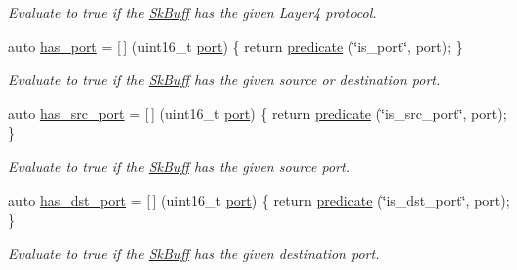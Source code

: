 \begin{DoxyCompactItemize}
\begin{DoxyCompactList}\small\item\em Evaluate to {\ttfamily true} if the \hyperlink{structpfq_1_1lang_1_1SkBuff}{Sk\+Buff} has the given Layer4 protocol. \end{DoxyCompactList}\item 
auto \hyperlink{namespacepfq_1_1lang_1_1anonymous__namespace_02default_8hpp_03_a9f7161b8dfb842c5a845f413eb6bc82f}{has\+\_\+port} = \mbox{[}$\,$\mbox{]} (uint16\+\_\+t \hyperlink{namespacepfq_1_1lang_1_1anonymous__namespace_02default_8hpp_03_a868eca03290a037cb4e9b7075085888b}{port}) \{ return \hyperlink{namespacepfq_1_1lang_aca9adafc436b7f851621b979fa1aaf88}{predicate} (\char`\"{}is\+\_\+port\char`\"{}, port); \}
\begin{DoxyCompactList}\small\item\em Evaluate to {\ttfamily true} if the \hyperlink{structpfq_1_1lang_1_1SkBuff}{Sk\+Buff} has the given source or destination port. \end{DoxyCompactList}\item 
auto \hyperlink{namespacepfq_1_1lang_1_1anonymous__namespace_02default_8hpp_03_a964d5ed41f50a1f3a04176f8e54d7a5a}{has\+\_\+src\+\_\+port} = \mbox{[}$\,$\mbox{]} (uint16\+\_\+t \hyperlink{namespacepfq_1_1lang_1_1anonymous__namespace_02default_8hpp_03_a868eca03290a037cb4e9b7075085888b}{port}) \{ return \hyperlink{namespacepfq_1_1lang_aca9adafc436b7f851621b979fa1aaf88}{predicate} (\char`\"{}is\+\_\+src\+\_\+port\char`\"{}, port); \}
\begin{DoxyCompactList}\small\item\em Evaluate to {\ttfamily true} if the \hyperlink{structpfq_1_1lang_1_1SkBuff}{Sk\+Buff} has the given source port. \end{DoxyCompactList}\item 
auto \hyperlink{namespacepfq_1_1lang_1_1anonymous__namespace_02default_8hpp_03_afa71ece0f4178d0200c0388f503eef14}{has\+\_\+dst\+\_\+port} = \mbox{[}$\,$\mbox{]} (uint16\+\_\+t \hyperlink{namespacepfq_1_1lang_1_1anonymous__namespace_02default_8hpp_03_a868eca03290a037cb4e9b7075085888b}{port}) \{ return \hyperlink{namespacepfq_1_1lang_aca9adafc436b7f851621b979fa1aaf88}{predicate} (\char`\"{}is\+\_\+dst\+\_\+port\char`\"{}, port); \}
\begin{DoxyCompactList}\small\item\em Evaluate to {\ttfamily true} if the \hyperlink{structpfq_1_1lang_1_1SkBuff}{Sk\+Buff} has the given destination port. \end{DoxyCompactList}\item 

\end{DoxyCompactItemize}
